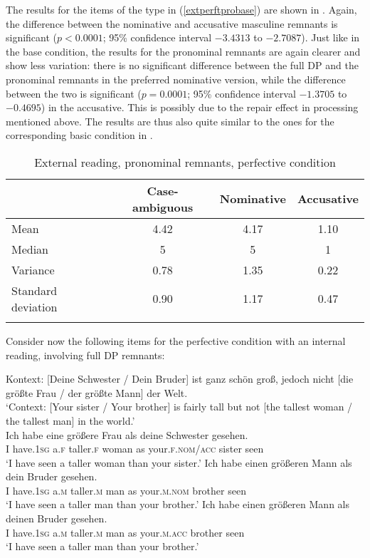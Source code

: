 The results for the items of the type in (\ref{extperftprobase}) are shown in .
Again, the difference between the nominative and accusative masculine remnants is significant ($p<0.0001$; 95\% confidence interval $-3.4313$ to $-2.7087$). Just like in the base condition, the results for the pronominal remnants are again clearer and show less variation: there is no significant difference between the full DP and the pronominal remnants in the preferred nominative version, while the difference between the two is significant ($p=0.0001$; 95\% confidence interval $-1.3705$ to $-0.4695$) in the accusative. This is possibly due to the repair effect in processing mentioned above. The results are thus also quite similar to the ones for the corresponding basic condition in .

\begin{table}
\begin{tabular}{l *3{S[table-format=1.2]}}
\lsptoprule
{} & {Case-ambiguous} & {Nominative} & {Accusative}\\
\midrule
Mean & 4.42 & 4.17 & 1.10\\
Median & 5 & 5 & 1\\
Variance & 0.78 & 1.35 & 0.22\\
Standard deviation & 0.90 & 1.17 & 0.47\\
\lspbottomrule
\end{tabular}
\caption{External reading, pronominal remnants, perfective condition}
\label{tableextperftprobase}
\end{table} 


Consider now the following items for the perfective condition with an internal reading, involving full DP remnants:

\ea Kontext: [Deine Schwester / Dein Bruder] ist ganz schön groß, jedoch nicht [die größte Frau / der größte Mann] der Welt. \label{intperftfullbase}\\
`Context: [Your sister / Your brother] is fairly tall but not [the tallest woman / the tallest man] in the world.'\\
\ea \gll Ich habe eine größere Frau als deine Schwester gesehen. \label{intperftfullbaseambig}\\
I have.\textsc{1sg} a.\textsc{f} taller.\textsc{f} woman as your.\textsc{f.nom/acc} sister seen\\
\glt `I have seen a taller woman than your sister.'
\ex \gll Ich habe einen größeren Mann als dein Bruder gesehen. \label{intperftfullbasenom}\\
I have.\textsc{1sg} a.\textsc{m} taller.\textsc{m} man as your.\textsc{m.nom} brother seen\\
\glt `I have seen a taller man than your brother.'
\ex \gll Ich habe einen größeren Mann als deinen Bruder gesehen. \label{intperftfullbaseacc}\\
I have.\textsc{1sg} a.\textsc{m} taller.\textsc{m} man as your.\textsc{m.acc} brother seen\\
\glt `I have seen a taller man than your brother.'
\z
\z


